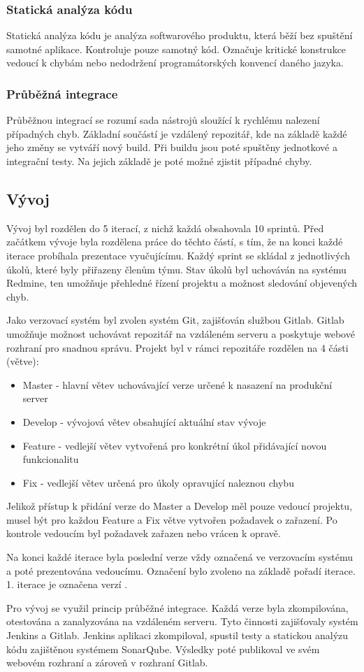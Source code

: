 \documentclass[thesis=B,czech]{FITthesis}[2012/06/26]
\begin{document}
\subsubsection{Statická analýza kódu}
Statická analýza kódu je analýza softwarového produktu, která běží bez spuštění samotné aplikace. Kontroluje 
pouze samotný kód. Označuje kritické konstrukce vedoucí k chybám nebo nedodržení programátorských konvencí daného
jazyka.
\subsubsection{Průběžná integrace}
Průběžnou integrací se rozumí sada nástrojů sloužící k rychlému nalezení případných chyb. Základní součástí je vzdálený repozitář, kde na 
základě každé jeho změny se vytváří nový build. Při buildu jsou poté spuštěny jednotkové a integrační testy.
Na jejich základě je poté možné zjistit případné chyby.

\subsection{Vývoj}
Vývoj byl rozdělen do 5 iterací, z nichž každá obsahovala 10 sprintů. Před začátkem vývoje byla rozdělena práce do těchto částí, 
s tím, že na konci každé iterace probíhala prezentace vyučujícímu. Každý sprint se skládal z jednotlivých
úkolů, které byly přiřazeny členům týmu. Stav úkolů byl uchováván na systému Redmine, ten umožňuje přehledné řízení projektu
a možnost sledování objevených chyb.
\par
Jako verzovací systém byl zvolen systém Git, zajišťován službou Gitlab. Gitlab umožňuje možnost uchovávat
repozitář na vzdáleném serveru a poskytuje webové rozhraní pro snadnou správu. Projekt byl v rámci repozitáře rozdělen na 4 části (větve):
\begin{itemize}
\item Master - hlavní větev uchovávající verze určené k nasazení na produkční server
\item Develop - vývojová větev obsahující aktuální stav vývoje
\item Feature - vedlejší větev vytvořená pro konkrétní úkol přidávající novou funkcionalitu
\item Fix - vedlejší větev určená pro úkoly opravující naleznou chybu
\end{itemize}
Jelikož přístup k přidání verze do Master a Develop měl pouze vedoucí projektu, musel být pro každou Feature a Fix větve
vytvořen požadavek o zařazení. Po kontrole vedoucím byl požadavek zařazen nebo vrácen k opravě.
\par
Na konci každé iterace byla poslední verze vždy označená ve verzovacím systému a poté prezentována vedoucímu.
Označení bylo zvoleno na základě pořadí iterace. 1. iterace je označena verzí .
\par
Pro vývoj se využil princip průběžné integrace. Každá verze byla zkompilována, otestována a zanalyzována na vzdáleném serveru.
Tyto činnosti zajišťovaly systém Jenkins a Gitlab. Jenkins aplikaci zkompiloval, spustil testy a statickou analýzu kódu 
zajištěnou systémem SonarQube. Výsledky poté publikoval ve svém webovém rozhraní a zároveň v rozhraní Gitlab.  
\end{document}

